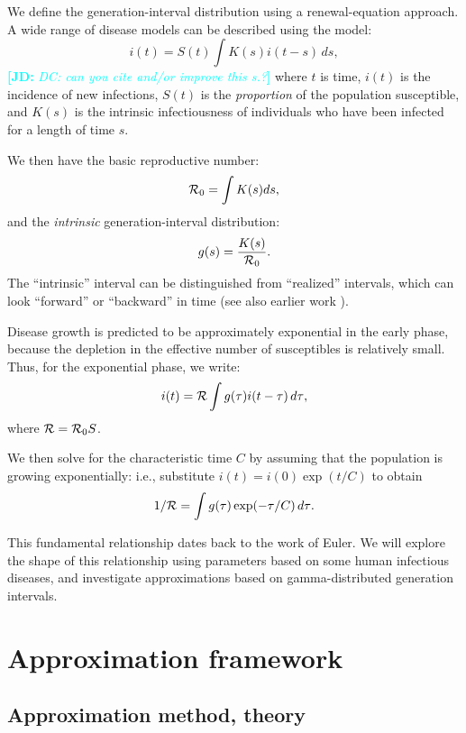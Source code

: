 \documentclass[12pt]{article}
\newcommand{\RR}{\ensuremath{{\cal R}}}
\newcommand{\Rx}[1]{\ensuremath{{\cal R}_{#1}}}
\newcommand{\Ro}{\Rx{0}}
\newcommand{\Tc}{\ensuremath{C}}
\newcommand{\comment}[3]{\textcolor{#1}{\textbf{[#2: }\textit{#3}\textbf{]}}}
\newcommand{\jd}[1]{\comment{cyan}{JD}{#1}}
\begin{document}
We define the generation-interval distribution using a renewal-equation approach.
A wide range of disease models can be described using the model: 
\begin{equation}
i(t) = S(t)\int{K(s)i(t-s) \,ds},
\label{eq:Renewal}
\end{equation}
\jd{DC: can you cite and/or improve this s.?}
where $t$ is time, $i(t)$ is the incidence of new infections, $S(t)$ is the \emph{proportion} of the population susceptible, and $K(s)$ is the intrinsic infectiousness of individuals who have been infected for a length of time $s$.

We then have the basic reproductive number: 
\begin{equation}
\Ro = \int{K(s)ds},
\end{equation}
and the \emph{intrinsic} generation-interval distribution:
\begin{equation}
g(s) = \frac{K(s)}{\Ro}.
\end{equation}
The ``intrinsic'' interval can be distinguished from ``realized'' intervals, which can look ``forward'' or ``backward'' in time \cite{ChamDush15} (see also earlier work \cite{Sven07,Nish10}).

Disease growth is predicted to be approximately exponential in the early phase, because the depletion in the effective number of susceptibles is relatively small.
Thus, for the exponential phase, we write:
\begin{equation}
i(t) = \RR\int{g(\tau)i(t-\tau) \,d\tau},
\end{equation}
where $\RR = \Ro S$.

We then solve for the characteristic time $\Tc$ by assuming that the population is growing exponentially: i.e., substitute $i(t) = i(0) \exp(t/\Tc)$ to obtain
\begin{equation}
	1/\RR = \int{g(\tau)\exp(-\tau/\Tc) \,d\tau}.\label{eq:Euler}
\end{equation}

This fundamental relationship dates back to the work of Euler. We will explore the shape of this relationship using parameters based on some human infectious diseases, and investigate approximations based on gamma-distributed generation intervals.

\section{Approximation framework}

\subsection{Approximation method, theory}
\end{document}
